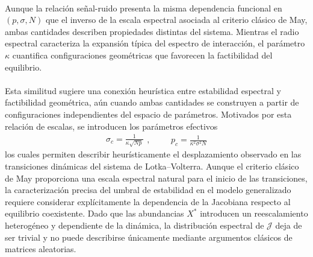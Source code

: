 \\
Aunque la relación señal-ruido presenta la misma dependencia funcional en $(p,\sigma,N)$ que el inverso de la escala espectral asociada al criterio clásico de May, ambas cantidades describen propiedades distintas del sistema. Mientras el radio espectral caracteriza la expansión típica del espectro de interacción, el parámetro $\kappa$ cuantifica configuraciones geométricas que favorecen la factibilidad del equilibrio.\\
\\
Esta similitud sugiere una conexión heurística entre estabilidad espectral y factibilidad geométrica, aún cuando ambas cantidades se construyen a partir de configuraciones independientes del espacio de parámetros. Motivados por esta relación de escalas, se introducen los parámetros efectivos
\begin{equation*}
	\begin{split}
		\sigma_c=\frac{1}{\kappa\sqrt{Np}}
	\end{split},\qquad
	\begin{split}
		p_c=\frac{1}{\kappa^2\sigma^2N}
	\end{split}
\end{equation*}
los cuales permiten describir heurísticamente el desplazamiento observado en las transiciones dinámicas del sistema de Lotka--Volterra. Aunque el criterio clásico de May proporciona una escala espectral natural para el inicio de las transiciones, la caracterización precisa del umbral de estabilidad en el modelo generalizado requiere considerar explícitamente la dependencia de la Jacobiana respecto al equilibrio coexistente. Dado que las abundancias $X^*$ introducen un reescalamiento heterogéneo y dependiente de la dinámica, la distribución espectral de $\mathcal{J}$ deja de ser trivial y no puede describirse únicamente mediante argumentos clásicos de matrices aleatorias.

